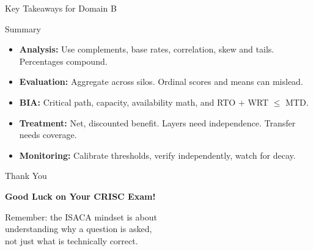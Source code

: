 \documentclass[aspectratio=169]{beamer}
\begin{document}
\begin{frame}{Key Takeaways for Domain B}
  \begin{block}{Summary}
    \begin{itemize}
      \item \textbf{Analysis:} Use complements, base rates, correlation, skew and tails. Percentages compound.
      \item \textbf{Evaluation:} Aggregate across silos. Ordinal scores and means can mislead.
      \item \textbf{BIA:} Critical path, capacity, availability math, and RTO $+$ WRT $\leq$ MTD.
      \item \textbf{Treatment:} Net, discounted benefit. Layers need independence. Transfer needs coverage.
      \item \textbf{Monitoring:} Calibrate thresholds, verify independently, watch for decay.
    \end{itemize}
  \end{block}
\end{frame}

\begin{frame}{Thank You}
  \begin{center}
    {\Huge \textbf{Good Luck on Your CRISC Exam!}}

    \vspace{1cm}

    Remember: the ISACA mindset is about\\
    understanding why a question is asked,\\
    not just what is technically correct.
  \end{center}
\end{frame}
\end{document}
